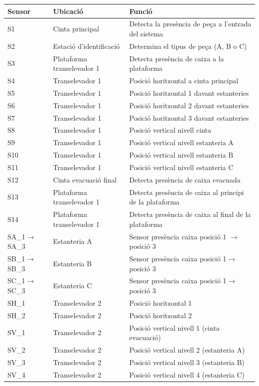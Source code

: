 \documentclass[12pt,a4paper]{report}
\begin{document}
\begin{table}[H]
\centering
\small
\begin{tabular}{|p{3cm}|p{5cm}|p{6cm}|}
\hline
\textbf{Sensor} & \textbf{Ubicació} & \textbf{Funció} \\ \hline

S1 & Cinta principal & Detecta la presència de peça a l'entrada del sistema \\ \hline
S2 & Estació d'identificació & Determina el tipus de peça (A, B o C) \\ \hline
S3 & Plataforma transelevador 1 & Detecta presència de caixa a la plataforma \\ \hline
S4 & Transelevador 1 & Posició horitzontal a cinta principal \\ \hline
S5 & Transelevador 1 & Posició horitzontal 1 davant estanteries \\ \hline
S6 & Transelevador 1 & Posició horitzontal 2 davant estanteries \\ \hline
S7 & Transelevador 1 & Posició horitzontal 3 davant estanteries \\ \hline
S8 & Transelevador 1 & Posició vertical nivell cinta \\ \hline
S9 & Transelevador 1 & Posició vertical nivell estanteria A \\ \hline
S10 & Transelevador 1 & Posició vertical nivell estanteria B \\ \hline
S11 & Transelevador 1 & Posició vertical nivell estanteria C \\ \hline
S12 & Cinta evacuació final & Detecta presència de caixa evacuada \\ \hline
S13 & Plataforma transelevador 1 & Detecta presència de caixa al principi de la plataforma \\ \hline
S14 & Plataforma transelevador 1 & Detecta presència de caixa  al final de la plataforma \\ \hline

SA\_1$\rightarrow$SA\_3 & Estanteria A & Sensor presència caixa posició 1 $\rightarrow$posició 3  \\ \hline
SB\_1$\rightarrow$SB\_3 & Estanteria B & Sensor presència caixa posició 1$\rightarrow$posició 3  \\ \hline
SC\_1$\rightarrow$SC\_3 & Estanteria C & Sensor presència caixa posició 1$\rightarrow$posició 3\\ \hline


SH\_1 & Transelevador 2 & Posició horitzontal 1 \\ \hline
SH\_2 & Transelevador 2 & Posició horitzontal 2 \\ \hline


SV\_1 & Transelevador 2 & Posició vertical nivell 1 (cinta evacuació)\\ \hline
SV\_2 & Transelevador 2 & Posició vertical nivell 2 (estanteria A)\\ \hline
SV\_3 & Transelevador 2 & Posició vertical nivell 3 (estanteria B)\\ \hline
SV\_4 & Transelevador 2 & Posició vertical nivell 4 (estanteria C)\\ \hline


\end{tabular}
\end{table}
\end{document}
